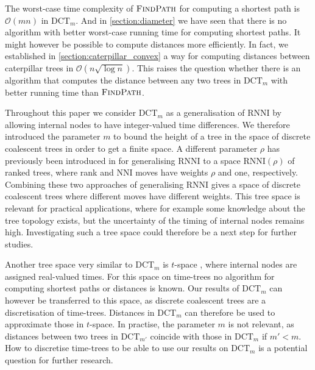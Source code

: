 \documentclass[11pt]{amsart}
\newcommand{\rnni}{\mathrm{RNNI}}
\newcommand{\findpath}{\textsc{FindPath}}
\newcommand{\nni}{\mathrm{NNI}}
\newcommand{\dtt}{\mathrm{DCT}}
\renewcommand{\O}{\mathcal O}
\newcommand{\summary}[1]{} %
\begin{document}
\summary{More efficient algorithm for computing distances (not shortest paths)}
The worst-case time complexity of $\findpath$ for computing a shortest path is $\O(mn)$ in $\dtt_m$.
And in \autoref{section:diameter} we have seen that there is no algorithm with better worst-case running time for computing shortest paths.
It might however be possible to compute distances more efficiently.
In fact, we established in \autoref{section:caterpillar_convex} a way for computing distances between caterpillar trees in $\O(n \sqrt{\log n})$.
This raises the question whether there is an algorithm that computes the distance between any two trees in $\dtt_m$ with better running time than $\findpath$.

\summary{$\rnni(rho)$ and parameter $\rho$ for discrete coalescent trees}
Throughout this paper we consider $\dtt_m$ as a generalisation of $\rnni$ by allowing internal nodes to have integer-valued time differences.
We therefore introduced the parameter $m$ to bound the height of a tree in the space of discrete coalescent trees in order to get a finite space.
A different parameter $\rho$ has previously been introduced in \textcite{Collienne2020-iu} for generalising $\rnni$ to a space $\rnni(\rho)$ of ranked trees, where rank and $\nni$ moves have weights $\rho$ and one, respectively.
Combining these two approaches of generalising $\rnni$ gives a space of discrete coalescent trees where different moves have different weights.
This tree space is relevant for practical applications, where for example some knowledge about the tree topology exists, but the uncertainty of the timing of internal nodes remains high.
Investigating such a tree space could therefore be a next step for further studies.

\summary{t-space}
Another tree space very similar to $\dtt_m$ is $t$-space \autocite{Gavryushkin2016-uu}, where internal nodes are assigned real-valued times.
For this space on time-trees no algorithm for computing shortest paths or distances is known.
Our results of $\dtt_m$ can however be transferred to this space, as discrete coalescent trees are a discretisation of time-trees.
Distances in $\dtt_m$ can therefore be used to approximate those in $t$-space.
In practise, the parameter $m$ is not relevant, as distances between two trees in $\dtt_{m'}$ coincide with those in $\dtt_m$ if $m' < m$.
How to discretise time-trees to be able to use our results on $\dtt_m$ is a potential question for further research.
\end{document}
